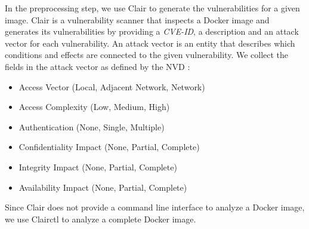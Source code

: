 In the preprocessing step, we use Clair to generate the vulnerabilities for a given image. Clair is a vulnerability scanner that inspects a Docker image and generates its vulnerabilities by providing a \textit{CVE-ID}, a description and an attack vector for each vulnerability. An attack vector is an entity that describes which conditions and effects are connected to the given vulnerability. We collect the fields in the attack vector as defined by the NVD \cite{booth2013national}:

\begin{itemize}
	\item Access Vector (Local, Adjacent Network, Network)
	\item Access Complexity (Low, Medium, High)
	\item Authentication (None, Single, Multiple)
	\item Confidentiality Impact (None, Partial, Complete)
	\item Integrity Impact (None, Partial, Complete)
	\item Availability Impact (None, Partial, Complete)
\end{itemize}

Since Clair does not provide a command line interface to analyze a Docker image, we use Clairctl to analyze a complete Docker image.

